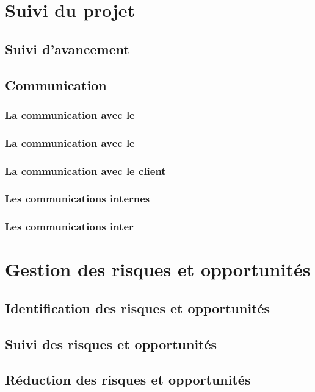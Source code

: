 \section{Suivi du projet} 


\subsection{Suivi d'avancement}

\subsection{Communication}
\subsubsection*{La communication avec le \tuteurPedagogique{}}
\subsubsection*{La communication avec le \tuteurQualite{}}
\subsubsection*{La communication avec le client}
\subsubsection*{Les communications internes}
\subsubsection*{Les communications inter\picCourt{}}  

\section{Gestion des risques et opportunités} 

\subsection{Identification des risques et opportunités}
\subsection{Suivi des risques et opportunités}
\subsection{Réduction des risques et opportunités}

